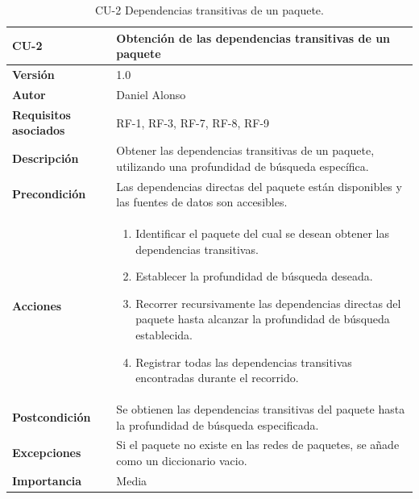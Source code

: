 \begin{table}[p]
	\centering
	\begin{tabularx}{\linewidth}{ p{} p{} }
		\toprule
		\textbf{CU-2}    & \textbf{Obtención de las dependencias transitivas de un paquete}\\
		\toprule
		\textbf{Versión}              & 1.0    \\
		\textbf{Autor}                & Daniel Alonso \\
		\textbf{Requisitos asociados} & RF-1, RF-3, RF-7, RF-8, RF-9 \\
		\textbf{Descripción}          & Obtener las dependencias transitivas de un paquete, utilizando una profundidad de búsqueda específica. \\
		\textbf{Precondición}         & Las dependencias directas del paquete están disponibles y las fuentes de datos son accesibles. \\
		\textbf{Acciones}             &
		\begin{enumerate}
			\def\labelenumi{\arabic{enumi}.}
			\tightlist
			\item Identificar el paquete del cual se desean obtener las dependencias transitivas.
			\item Establecer la profundidad de búsqueda deseada.
			\item Recorrer recursivamente las dependencias directas del paquete hasta alcanzar la profundidad de búsqueda establecida.
			\item Registrar todas las dependencias transitivas encontradas durante el recorrido.
		\end{enumerate}\\
		\textbf{Postcondición}        & Se obtienen las dependencias transitivas del paquete hasta la profundidad de búsqueda especificada. \\
		\textbf{Excepciones}          & Si el paquete no existe en las redes de paquetes, se añade como un diccionario vacio.\\
		\textbf{Importancia}          & Media \\
		\bottomrule
	\end{tabularx}
	\caption{CU-2 Dependencias transitivas de un paquete.}
	\label{tab:cu2}
\end{table}


